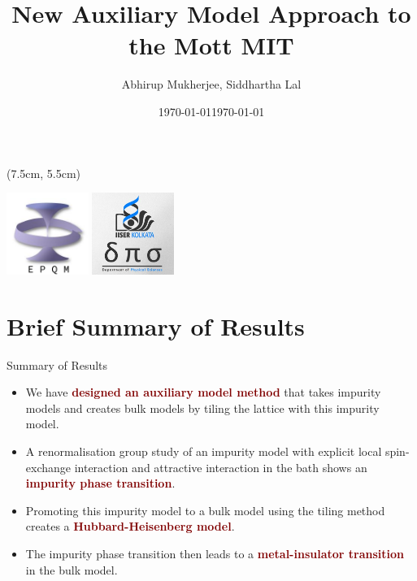 \documentclass[aspectratio=169]{beamer}
\title{
{New Auxiliary Model Approach to the Mott MIT
}
}
\date{\today}
\author{\large Abhirup Mukherjee, Siddhartha Lal}
\institute{Department of Physical Sciences, IISER Kolkata, Mohanpur}
\date{\large\today}
\newcommand{\focus}[1]{\textcolor{maroon}{\textbf{#1}}}
\begin{document}
\begin{frame}[noframenumbering]
\maketitle
\begin{textblock*}{0.7\textwidth}(7.5cm, 5.5cm)
	\centering
	\vspace*{\fill}

	\hspace*{\fill}
	\includegraphics[width=0.2\textwidth]{figures/epqm_logo_mod.jpeg}
	\includegraphics[width=0.2\textwidth]{figures/dps_logo.jpeg}
	\hspace*{\fill}

	\vspace*{\fill}
\end{textblock*}
\end{frame}

\section{Brief Summary of Results}
\begin{frame}[noframenumbering]{Summary of Results}
\begin{itemize}[<+->]
	\item We have \focus{designed an auxiliary model method} that takes impurity models and creates bulk models by tiling the lattice with this impurity model.
	\item A renormalisation group study of an impurity model with explicit local spin-exchange interaction and attractive interaction in the bath shows an \focus{impurity phase transition}.
	\item Promoting this impurity model to a bulk model using the tiling method creates a \focus{Hubbard-Heisenberg model}.
	\item The impurity phase transition then leads to a \focus{metal-insulator transition} in the bulk model.
\end{itemize}
\end{frame}
\end{document}
